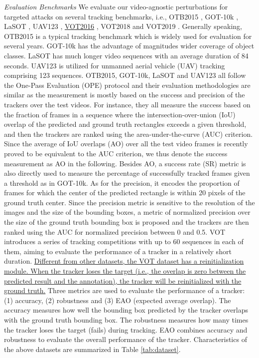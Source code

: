 \documentclass[journal]{IEEEtran}
\newcommand{\ie}{i.e.}
\begin{document}
\textit{Evaluation Benchmarks} We evaluate our video-agnostic perturbations for targeted attacks on several tracking benchmarks, \ie, OTB2015 \cite{OTB}, GOT-10k \cite{GOT-10k}, LaSOT \cite{LaSOT}, UAV123 \cite{UAV123}, \uline{VOT2016} \cite{VOT2016}, VOT2018 \cite{VOT2018} and VOT2019 \cite{VOT2019}.
Generally speaking, OTB2015 is a typical tracking benchmark which is widely used for evaluation for several years. 
GOT-10k has the advantage of magnitudes wider coverage of object classes. 
LaSOT has much longer video sequences with an average duration of 84 seconds.
UAV123 is utilized for unmanned aerial vehicle (UAV) tracking comprising 123 sequences. 
OTB2015, GOT-10k, LaSOT and UAV123 all follow the One-Pass Evaluation (OPE) protocol and their evaluation methodologies are similar as the measurement is mostly based on the success and precision of the trackers over the test videos. For instance, they all measure the success based on the fraction of frames in a sequence where the intersection-over-union (IoU) overlap of the predicted and ground truth rectangles exceeds a given threshold, and then the trackers are ranked using the area-under-the-curve (AUC) criterion. Since the average of IoU overlaps (AO) over all the test video frames is recently proved to be equivalent to the AUC criterion, we thus denote the success measurement as AO in the following. Besides AO, a success rate (SR) metric is also directly used to measure the percentage of successfully tracked frames given a threshold as in GOT-10k. As for the precision, it encodes the proportion of frames for which the center of the predicted rectangle is within 20 pixels of the ground truth center. Since the precision metric is sensitive to the resolution of the images and the size of the bounding boxes, a metric of normalized precision over the size of the ground truth bounding box is proposed and the trackers are then ranked using the AUC for normalized precision between 0 and 0.5. 
VOT \cite{VOT2016,VOT2018,VOT2019} introduces a series of tracking competitions with up to 60 sequences in each of them, aiming to evaluate the performance of a tracker in a relatively short duration. 
\uline{Different from other datasets, the VOT dataset has a reinitialization module. When the tracker loses the target (i.e., the overlap is zero between the predicted result and the annotation), the tracker will be reinitialized with the ground truth.}
Three metrics are used to evaluate the performance of a tracker: (1) accuracy, (2) robustness and (3) EAO (expected average overlap). The accuracy measures how well the bounding box predicted by the tracker overlaps with the ground truth bounding box. The robustness measures how many times the tracker loses the target (fails) during tracking. EAO combines accuracy and robustness to evaluate the overall performance of the tracker.
Characteristics of the above datasets are summarized in Table \ref{tab:dataset}.
\end{document}
